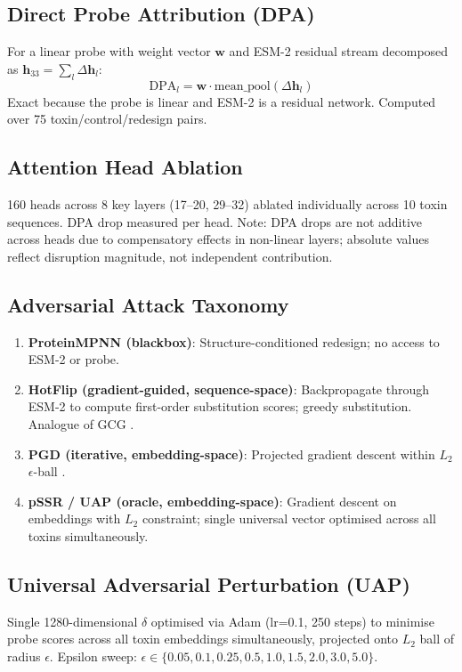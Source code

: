 \documentclass[11pt,a4paper]{article}
\begin{document}
\subsection{Direct Probe Attribution (DPA)}
For a linear probe with weight vector $\mathbf{w}$ and ESM-2 residual stream decomposed as $\mathbf{h}_{33} = \sum_l \Delta\mathbf{h}_l$:
\begin{equation}
\text{DPA}_l = \mathbf{w} \cdot \text{mean\_pool}(\Delta\mathbf{h}_l)
\end{equation}
Exact because the probe is linear and ESM-2 is a residual network. Computed over 75 toxin/control/redesign pairs.

\subsection{Attention Head Ablation}
160 heads across 8 key layers (17--20, 29--32) ablated individually across 10 toxin sequences. DPA drop measured per head. Note: DPA drops are not additive across heads due to compensatory effects in non-linear layers; absolute values reflect disruption magnitude, not independent contribution.

\subsection{Adversarial Attack Taxonomy}
\begin{enumerate}
    \item \textbf{ProteinMPNN (blackbox)}: Structure-conditioned redesign; no access to ESM-2 or probe.
    \item \textbf{HotFlip (gradient-guided, sequence-space)}: Backpropagate through ESM-2 to compute first-order substitution scores; greedy substitution. Analogue of GCG \cite{zou2023universal}.
    \item \textbf{PGD (iterative, embedding-space)}: Projected gradient descent within $L_2$ $\epsilon$-ball \cite{madry2018pgd}.
    \item \textbf{pSSR / UAP (oracle, embedding-space)}: Gradient descent on embeddings with $L_2$ constraint; single universal vector optimised across all toxins simultaneously.
\end{enumerate}

\subsection{Universal Adversarial Perturbation (UAP)}
Single 1280-dimensional $\delta$ optimised via Adam (lr=0.1, 250 steps) to minimise probe scores across all toxin embeddings simultaneously, projected onto $L_2$ ball of radius $\epsilon$. Epsilon sweep: $\epsilon \in \{0.05, 0.1, 0.25, 0.5, 1.0, 1.5, 2.0, 3.0, 5.0\}$.
\end{document}
